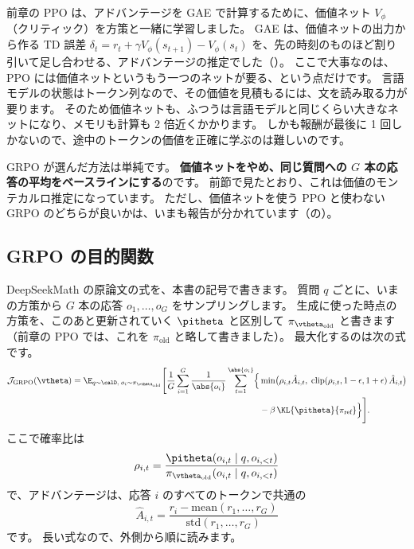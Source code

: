 前章の PPO は、アドバンテージを GAE で計算するために、価値ネット $V_\phi$（クリティック）を方策と一緒に学習しました。
GAE は、価値ネットの出力から作る TD 誤差 $\delta_t=r_t+\gamma V_\phi(s_{t+1})-V_\phi(s_t)$ を、先の時刻のものほど割り引いて足し合わせる、アドバンテージの推定でした（）。
ここで大事なのは、PPO には価値ネットというもう一つのネットが要る、という点だけです。
言語モデルの状態はトークン列なので、その価値を見積もるには、文を読み取る力が要ります。
そのため価値ネットも、ふつうは言語モデルと同じくらい大きなネットになり、メモリも計算も 2 倍近くかかります。
しかも報酬が最後に 1 回しかないので、途中のトークンの価値を正確に学ぶのは難しいのです。

GRPO が選んだ方法は単純です。
\textbf{価値ネットをやめ、同じ質問への $G$ 本の応答の平均をベースラインにする}のです。
前節で見たとおり、これは価値のモンテカルロ推定になっています。
ただし、価値ネットを使う PPO と使わない GRPO のどちらが良いかは、いまも報告が分かれています（の）。

\subsection{GRPO の目的関数}

DeepSeekMath の原論文\cite{shao2024deepseekmath}の式を、本書の記号で書きます。
質問 $q$ ごとに、いまの方策から $G$ 本の応答 $o_1,\dots,o_G$ をサンプリングします。
生成に使った時点の方策を、このあと更新されていく $\pitheta$ と区別して $\pi_{\vtheta_{\text{old}}}$ と書きます（前章の PPO では、これを $\pi_{\text{old}}$ と略して書きました）。
最大化するのは次の式です。
\begin{equation}
\begin{split}
\mathcal{J}_{\text{GRPO}}(\vtheta)=
\E_{q\sim\calD,\;o_i\sim\pi_{\vtheta_{\text{old}}}}\Biggl[\frac{1}{G}\sum_{i=1}^{G}\frac{1}{\abs{o_i}}\sum_{t=1}^{\abs{o_i}}
\Bigl\{&\min\bigl(\rho_{i,t}\hat A_{i,t},\;\mathrm{clip}(\rho_{i,t},1-\epsilon,1+\epsilon)\,\hat A_{i,t}\bigr)\\
&-\beta\,\KL{\pitheta}{\pi_{\text{ref}}}\Bigr\}\Biggr].
\end{split}
\label{eq:rl-grpo}
\end{equation}
ここで確率比は
\begin{equation}
\rho_{i,t}=\frac{\pitheta(o_{i,t}\mid q,o_{i,<t})}{\pi_{\vtheta_{\text{old}}}(o_{i,t}\mid q,o_{i,<t})}
\label{eq:rl-ratio}
\end{equation}
で、アドバンテージは、応答 $i$ のすべてのトークンで共通の
\begin{equation}
\hat A_{i,t}=\frac{r_i-\mathrm{mean}(r_1,\dots,r_G)}{\mathrm{std}(r_1,\dots,r_G)}
\label{eq:rl-grpo-adv}
\end{equation}
です。
長い式なので、外側から順に読みます。

